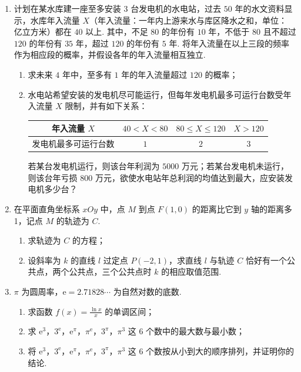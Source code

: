 \begin{description}
\begin{enumerate}[leftmargin=5pt]
        \item 计划在某水库建一座至多安装 \(3\text{ 台}\)发电机的水电站，过去 \(50\text{ 年}\)的水文资料显示，水库年入流量 \(X\)（年入流量：一年内上游来水与库区降水之和，单位：\(\text{亿立方米}\)）都在 \(40\) 以上. 其中，不足 \(80\) 的年份有 \(10\text{ 年}\)，不低于 \(80\) 且不超过 \(120\) 的年份有 \(35\text{ 年}\)，超过 \(120\) 的年份有 \(5\text{ 年}\). 将年入流量在以上三段的频率作为相应段的概率，并假设各年的年入流量相互独立.
\begin{enumerate}
\item 求未来 \(4\text{ 年}\)中，至多有 \(1\text{ 年}\)的年入流量超过 \(120\) 的概率；
\item 水电站希望安装的发电机尽可能运行，但每年发电机最多可运行台数受年入流量 \(X\) 限制，并有如下关系：

\begin{center}
\begin{tabular}{c|ccc}
\hline
年入流量 \(X\) & \(40<X<80\) & \(80\leqslant X\leqslant 120\) & \(X>120\) \\
\hline
发电机最多可运行台数 & \(1\) & \(2\) & \(3\) \\
\hline
\end{tabular}
\end{center}

若某台发电机运行，则该台年利润为 \(5000\text{ 万元}\)；若某台发电机未运行，则该台年亏损 \(800\text{ 万元}\)，欲使水电站年总利润的均值达到最大，应安装发电机多少台？
\end{enumerate}

        \item 在平面直角坐标系 \(xOy\) 中，点 \(M\) 到点 \(F(1,0)\) 的距离比它到 \(y\) 轴的距离多 1，记点 \(M\) 的轨迹为 \(C\).
\begin{enumerate}
\item 求轨迹为 \(C\) 的方程；
\item 设斜率为 \(k\) 的直线 \(l\) 过定点 \(P(-2,1)\)，求直线 \(l\) 与轨迹 \(C\) 恰好有一个公共点，两个公共点，三个公共点时 \(k\) 的相应取值范围.
\end{enumerate}

        \item \(\pi\) 为圆周率，\({\mathrm{e}} = 2.71828\cdots\) 为自然对数的底数.
\begin{enumerate}
\item 求函数 \( f(x) = \frac{\ln x}{x} \) 的单调区间；
\item 求 \( {\mathrm{e}}^{3} \)，\( 3^{{\mathrm{e}}} \)，\( {\mathrm{e}}^{\pi} \)，\( \pi^{{\mathrm{e}}} \)，\( 3^{\pi} \)，\( \pi^{3} \) 这 6 个数中的最大数与最小数；
\item 将 \( {\mathrm{e}}^{3} \)，\( 3^{{\mathrm{e}}} \)，\( {\mathrm{e}}^{\pi} \)，\( \pi^{{\mathrm{e}}} \)，\( 3^{\pi} \)，\( \pi^{3} \) 这 6 个数按从小到大的顺序排列，并证明你的结论.
\end{enumerate}

    \end{enumerate}

\end{description}


